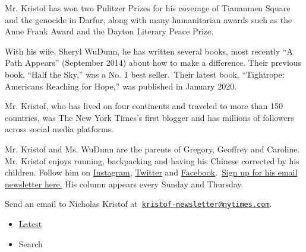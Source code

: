 Mr. Kristof has won two Pulitzer Prizes for his coverage of Tiananmen
Square and the genocide in Darfur, along with many humanitarian awards
such as the Anne Frank Award and the Dayton Literary Peace Prize.

With his wife, Sheryl WuDunn, he has written several books, most
recently ``A Path Appears'' (September 2014) about how to make a
difference. Their previous book, ``Half the Sky,'' was a No. 1 best
seller.~Their latest book, ``Tightrope: Americans Reaching for Hope,''
was published in January 2020.~

Mr. Kristof, who has lived on four continents and traveled to more than
150 countries, was The New York Times's first blogger and has millions
of followers across social media platforms.

Mr. Kristof and Ms. WuDunn are the parents of Gregory, Geoffrey and
Caroline. Mr. Kristof enjoys running, backpacking and having his Chinese
corrected by his children. Follow him on
\href{http://instagram.com/nickkristof}{Instagram},
\href{https://twitter.com/NickKristof}{Twitter} and
\href{https://www.facebook.com/kristof}{Facebook}.~\href{https://www.nytimes.com/newsletters/nicholas-kristof}{Sign
up for his email newsletter here.} His column appears every Sunday and
Thursday.

Send an email to Nicholas Kristof
at~\href{mailto:kristof-newsletter@nytimes.com}{\nolinkurl{kristof-newsletter@nytimes.com}}.

\begin{itemize}
\tightlist
\item
  \protect\hyperlink{stream-panel}{Latest}
\item
  Search
\end{itemize}

